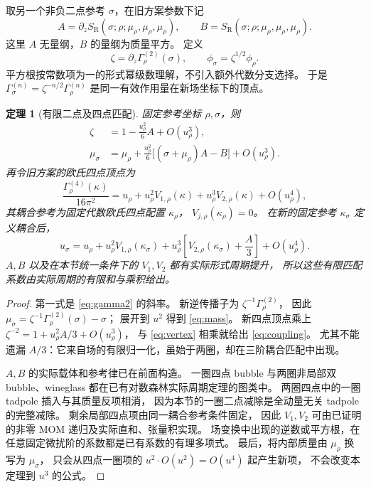 \documentclass[11pt,a4paper]{ctexart}
\theoremstyle{cnplain}
\newtheorem{theorem}{定理}[section]
\theoremstyle{remark}\newtheorem{remark}[theorem]{注}
\newcommand{\SR}{S_{\mathrm R}}
\begin{document}
取另一个非负二点参考 $\sigma$，在旧方案参数下记
\begin{equation}\label{eq:AB}
 A=\partial_z\SR(\sigma;\rho;\mu_\rho,\mu_\rho,\mu_\rho),\qquad
 B=\SR(\sigma;\rho;\mu_\rho,\mu_\rho,\mu_\rho).
\end{equation}
这里 $A$ 无量纲，$B$ 的量纲为质量平方。
定义
\[
 \zeta=\partial_z\Gamma^{(2)}_\rho(\sigma),\qquad
 \phi_\sigma=\zeta^{1/2}\phi_\rho.
\]
平方根按常数项为一的形式幂级数理解，不引入额外代数分支选择。
于是 $\Gamma^{(n)}_\sigma=\zeta^{-n/2}\Gamma^{(n)}_\rho$
是同一有效作用量在新场坐标下的顶点。

\begin{theorem}[有限二点及四点匹配]\label{thm:matching}
固定参考坐标 $\rho,\sigma$，则
\begin{align}
 \zeta&=1-\frac{u_\rho^2}{6}A+O(u_\rho^3),\label{eq:zeta}\\
 \mu_\sigma&=\mu_\rho+
       \frac{u_\rho^2}{6}\bigl[(\sigma+\mu_\rho)A-B\bigr]
       +O(u_\rho^3).\label{eq:mass}
\end{align}
再令旧方案的欧氏四点顶点为
\begin{equation}\label{eq:vertex}
 \frac{\Gamma^{(4)}_\rho(\kappa)}{16\pi^2}
   =u_\rho+u_\rho^2V_{1,\rho}(\kappa)
            +u_\rho^3V_{2,\rho}(\kappa)+O(u_\rho^4),
\end{equation}
其耦合参考为固定代数欧氏四点配置 $\kappa_\rho$，
$V_{j,\rho}(\kappa_\rho)=0$。
在新的固定参考 $\kappa_\sigma$ 定义耦合后，
\begin{equation}\label{eq:coupling}
 u_\sigma=u_\rho+u_\rho^2V_{1,\rho}(\kappa_\sigma)
    +u_\rho^3\left[V_{2,\rho}(\kappa_\sigma)+\frac A3\right]
    +O(u_\rho^4).
\end{equation}
$A,B$ 以及在本节统一条件下的 $V_1,V_2$ 都有实际形式周期提升，
所以这些有限匹配系数由实际周期的有限和与乘积给出。
\end{theorem}
\begin{proof}
第一式是 \eqref{eq:gamma2} 的斜率。
新逆传播子为 $\zeta^{-1}\Gamma^{(2)}_\rho$，
因此 $\mu_\sigma=\zeta^{-1}\Gamma^{(2)}_\rho(\sigma)-\sigma$；
展开到 $u^2$ 得到 \eqref{eq:mass}。
新四点顶点乘上 $\zeta^{-2}=1+u_\rho^2 A/3+O(u_\rho^3)$，
与 \eqref{eq:vertex} 相乘就给出 \eqref{eq:coupling}。
尤其不能遗漏 $A/3$：它来自场的有限归一化，虽始于两圈，却在三阶耦合匹配中出现。

$A,B$ 的实际载体和参考律已在前面构造。
一圈四点 bubble 与两圈非局部双 bubble、wineglass 都在已有对数森林实际周期定理的图类中。
两圈四点中的一圈 tadpole 插入与其质量反项相消，
因为本节的一圈二点减除是全动量无关 tadpole 的完整减除。
剩余局部四点项由同一耦合参考条件固定，
因此 $V_1,V_2$ 可由已证明的非零 MOM 递归及实际直和、张量积实现。
场变换中出现的逆数或平方根，在任意固定微扰阶的系数都是已有系数的有理多项式。
最后，将内部质量由 $\mu_\rho$ 换写为 $\mu_\sigma$，
只会从四点一圈项的 $u^2\cdot O(u^2)=O(u^4)$ 起产生新项，
不会改变本定理到 $u^3$ 的公式。
\end{proof}
\end{document}
